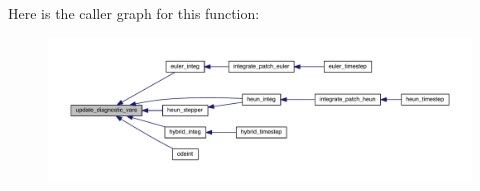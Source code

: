 Here is the caller graph for this function\+:\nopagebreak
\begin{figure}[H]
\begin{center}
\leavevmode
\includegraphics[width=350pt]{rk4__misc_8f90_a0ab2c98c1ad9c2055600815f75fef779_icgraph}
\end{center}
\end{figure}


